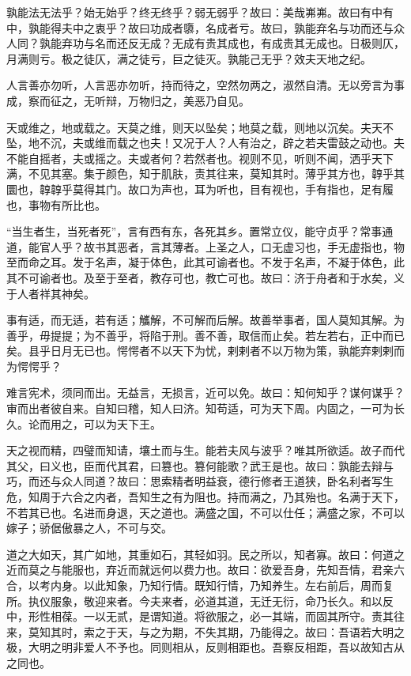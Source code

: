 \documentclass[]{article}
\begin{document}
孰能法无法乎？始无始乎？终无终乎？弱无弱乎？故曰：美哉岪岪。故曰有中有中，孰能得夫中之衷乎？故曰功成者隳，名成者亏。故曰，孰能弃名与功而还与众人同？孰能弃功与名而还反无成？无成有贵其成也，有成贵其无成也。日极则仄，月满则亏。极之徒仄，满之徒亏，巨之徒灭。孰能己无乎？效夫天地之纪。

人言善亦勿听，人言恶亦勿听，持而待之，空然勿两之，淑然自清。无以旁言为事成，察而征之，无听辩，万物归之，美恶乃自见。

天或维之，地或载之。天莫之维，则天以坠矣；地莫之载，则地以沉矣。夫天不坠，地不沉，夫或维而载之也夫！又况于人？人有治之，辟之若夫雷鼓之动也。夫不能自摇者，夫或摇之。夫或者何？若然者也。视则不见，听则不闻，洒乎天下满，不见其塞。集于颜色，知于肌肤，责其往来，莫知其时。薄乎其方也，韕乎其圜也，韕韕乎莫得其门。故口为声也，耳为听也，目有视也，手有指也，足有履也，事物有所比也。

``当生者生，当死者死''，言有西有东，各死其乡。置常立仪，能守贞乎？常事通道，能官人乎？故书其恶者，言其薄者。上圣之人，口无虚习也，手无虚指也，物至而命之耳。发于名声，凝于体色，此其可谕者也。不发于名声，不凝于体色，此其不可谕者也。及至于至者，教存可也，教亡可也。故曰：济于舟者和于水矣，义于人者祥其神矣。

事有适，而无适，若有适；觿解，不可解而后解。故善举事者，国人莫知其解。为善乎，毋提提；为不善乎，将陷于刑。善不善，取信而止矣。若左若右，正中而已矣。县乎日月无已也。愕愕者不以天下为忧，剌剌者不以万物为策，孰能弃剌剌而为愕愕乎？

难言宪术，须同而出。无益言，无损言，近可以免。故曰：知何知乎？谋何谋乎？审而出者彼自来。自知曰稽，知人曰济。知苟适，可为天下周。内固之，一可为长久。论而用之，可以为天下王。

天之视而精，四璧而知请，壤土而与生。能若夫风与波乎？唯其所欲适。故子而代其父，曰义也，臣而代其君，曰篡也。篡何能歌？武王是也。故曰：孰能去辩与巧，而还与众人同道？故曰：思索精者明益衰，德行修者王道狭，卧名利者写生危，知周于六合之内者，吾知生之有为阻也。持而满之，乃其殆也。名满于天下，不若其已也。名进而身退，天之道也。满盛之国，不可以仕任；满盛之家，不可以嫁子；骄倨傲暴之人，不可与交。

道之大如天，其广如地，其重如石，其轻如羽。民之所以，知者寡。故曰：何道之近而莫之与能服也，弃近而就远何以费力也。故曰：欲爱吾身，先知吾情，君亲六合，以考内身。以此知象，乃知行情。既知行情，乃知养生。左右前后，周而复所。执仪服象，敬迎来者。今夫来者，必道其道，无迁无衍，命乃长久。和以反中，形性相葆。一以无贰，是谓知道。将欲服之，必一其端，而固其所守。责其往来，莫知其时，索之于天，与之为期，不失其期，乃能得之。故曰：吾语若大明之极，大明之明非爱人不予也。同则相从，反则相距也。吾察反相距，吾以故知古从之同也。
\end{document}
